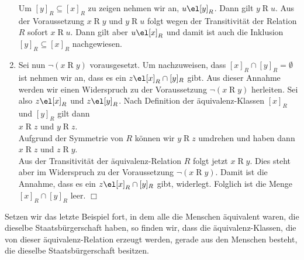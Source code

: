 \begin{enumerate}
      Um $[y]_R \subseteq [x]_R$ zu zeigen nehmen wir an, $u \el [y]_R$.
      Dann gilt $y \mathop{R} u$.  Aus der Voraussetzung $x \mathop{R} y$ und
      $y \mathop{R} u$ folgt wegen der Transitivit\"{a}t der Relation $R$ sofort
      $x \mathop{R} u$.  Dann gilt aber $u \el [x]_R$ und damit ist auch die Inklusion
      $[y]_R \subseteq [x]_R$ nachgewiesen.
\item Sei nun $\neg (x \mathop{R} y)$ vorausgesetzt.  Um nachzuweisen,
      dass  $[x]_R \cap [y]_R = \emptyset$ ist nehmen wir an, dass
      es ein $z \el [x]_R \cap [y]_R$ gibt.  Aus dieser Annahme werden wir einen
      Widerspruch zu der Voraussetzung $\neg (x \mathop{R} y)$ 
        herleiten.  Sei also $z \el[x]_R$ und $z \el [y]_R$.  Nach Definition
        der \"{a}quivalenz-Klassen $[x]_R$ und $[y]_R$ gilt dann 
      \\[0.2cm]
      \hspace*{1.3cm}      
      $x \mathop{R} z$ \quad und \quad $y \mathop{R} z$.
      \\[0.2cm]
      Aufgrund der Symmetrie von $R$ k\"{o}nnen wir $y \mathop{R} z$ umdrehen und haben dann
      \\[0.2cm]
      \hspace*{1.3cm}      
      $x \mathop{R} z$ \quad und \quad $z \mathop{R} y$.
      \\[0.2cm]
      Aus der Transitivit\"{a}t der \"{a}quivalenz-Relation $R$ folgt jetzt
      $x \mathop{R} y$.
      Dies steht aber im Widerspruch zu der Voraussetzung $\neg (x \mathop{R} y)$.
      Damit ist die Annahme, dass es ein $z \el [x]_R \cap [y]_R$ gibt, widerlegt.
      Folglich ist die Menge $[x]_R \cap [y]_R$ leer.
      \hspace*{\fill} $\Box$
\end{enumerate}

\example
Setzen wir das letzte Beispiel fort, in dem alle die Menschen \"{a}quivalent waren, die dieselbe
Staatsb\"{u}rgerschaft haben, so finden wir, dass die \"{a}quivalenz-Klassen, die von dieser
\"{a}quivalenz-Relation erzeugt werden, gerade aus den Menschen besteht, die dieselbe
Staatsb\"{u}rgerschaft besitzen.


